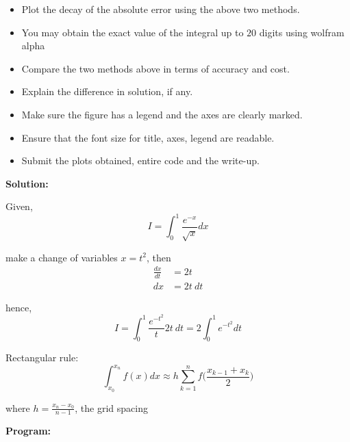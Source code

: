 \documentclass[a4paper,11pt]{report}
\begin{document}
\begin{enumerate}
    \begin{itemize}
    \item Plot the decay of the absolute error using the above two methods.
    \item You may obtain the exact value of the integral up to $20$ digits using wolfram alpha
    \item Compare the two methods above in terms of accuracy and cost.
    \item Explain the difference in solution, if any.
    \item Make sure the figure has a legend and the axes are clearly marked.
    \item Ensure that the font size for title, axes, legend are readable.
    \item Submit the plots obtained, entire code and the write-up.
    \end{itemize}
    
    \textbf{Solution:}
    
    Given,
    \begin{equation*}
    I = \int_{0}^{1} \frac{e^{-x}}{\sqrt{x}} dx
    \end{equation*}

    make a change of variables $x = t^{2}$, then 
    \begin{equation*}
    \begin{aligned}
    \frac{dx}{dt} &= 2t \\
    dx &= 2t\ dt
    \end{aligned}
    \end{equation*}
    
    hence, 
    \begin{equation*}
    I = \int_{0}^{1} \frac{e^{-t^{2}}}{t} 2t\ dt = 2 \int_{0}^{1} e^{-t^{2}} dt
    \end{equation*}

    Rectangular rule:
    \begin{equation*}
    \int_{x_{0}}^{x_{n}} f(x) dx \approx h \sum_{k=1}^{n} f \Bigg(\frac{x_{k-1} + x_{k}}{2} \Bigg)
    \end{equation*}

    where $h = \displaystyle \frac{x_{n} - x_{0}}{n-1}$, the grid spacing

    \textbf{Program:}
    

    \begin{figure}[ht!]
    \centering
    \resizebox{0.9\linewidth}{!}{}
    \end{figure}


\end{enumerate}
\end{document}
